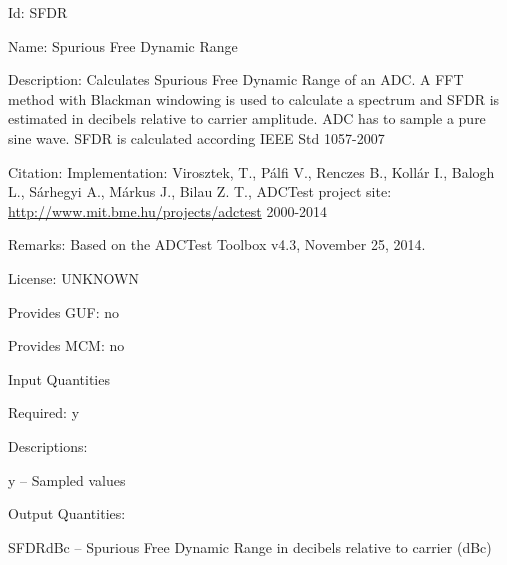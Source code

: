 \begin{tightdesc}
\item [Id:] SFDR
\item [Name:] Spurious Free Dynamic Range
\item [Description:] Calculates Spurious Free Dynamic Range of an ADC. A FFT method with Blackman windowing is used to calculate a spectrum and SFDR is estimated in decibels relative to carrier amplitude. ADC has to sample a pure sine wave. SFDR is calculated according IEEE Std 1057-2007
\item [Citation:] Implementation: Virosztek, T., Pálfi V., Renczes B., Kollár I., Balogh L., Sárhegyi A., Márkus J., Bilau Z. T., ADCTest project site: \url{http://www.mit.bme.hu/projects/adctest} 2000-2014
\item [Remarks:] Based on the ADCTest Toolbox v4.3, November 25, 2014.
\item [License:] UNKNOWN
\item [Provides GUF:] no
\item [Provides MCM:] no
\item [Input Quantities] \rule{0em}{0em}
    \begin{tightdesc}
    \item [Required:] 
        \textsf{y}
    \item [Descriptions:] \rule{0em}{0em}
        \begin{tightdesc}
            \item[\textsf{y}] -- Sampled values
        \end{tightdesc}
    \end{tightdesc}
\item [Output Quantities:] \rule{0em}{0em}
    \begin{tightdesc}
        \item[\textsf{SFDRdBc}] -- Spurious Free Dynamic Range in decibels relative to carrier (dBc)
    \end{tightdesc}
\end{tightdesc}
